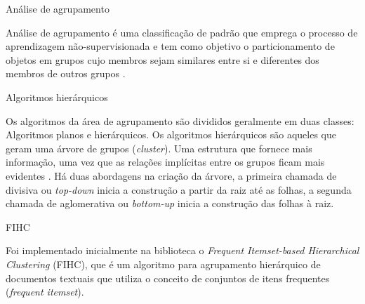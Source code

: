 \documentclass[final]{beamer}
\newlength{\onecolwid}
\newlength{\twocolwid}
\begin{document}
\begin{frame}[t]
\begin{columns}[t]
\begin{column}{\twocolwid}
\begin{columns}[t,totalwidth=\twocolwid]
\begin{column}{\onecolwid}\vspace{-.6in} %


\begin{block}{Análise de agrupamento}

Análise de agrupamento é uma classificação de padrão que emprega o processo de aprendizagem não-supervisionada e tem como objetivo o particionamento de objetos em grupos cujo membros sejam similares entre si e diferentes dos membros de outros grupos \cite{Jain:1999}.


\end{block}

\begin{block}{Algoritmos hierárquicos}

Os algoritmos da área de agrupamento são divididos geralmente em duas classes: Algoritmos planos e hierárquicos.
Os algoritmos hierárquicos são aqueles que geram uma árvore de grupos (\textit{cluster}). Uma estrutura que fornece mais informação, uma vez que as relações implícitas entre os grupos ficam mais evidentes \cite{Manning:2009}.
Há duas abordagens na criação da árvore, a primeira chamada de divisiva ou \textit{top-down} inicia a construção a partir da raiz até as folhas, a segunda chamada de aglomerativa ou \textit{bottom-up} inicia a construção das folhas à raiz.

\end{block}


\begin{block}{FIHC}

Foi implementado inicialmente na biblioteca o \textit{Frequent Itemset-based Hierarchical Clustering} (FIHC), que é um algoritmo para agrupamento hierárquico de documentos textuais \cite{Martin:2004} que utiliza o conceito de conjuntos de itens frequentes (\textit{frequent itemset}).


\end{block}
\end{column}
\end{columns}
\end{column}
\end{columns}
\end{frame}
\end{document}
